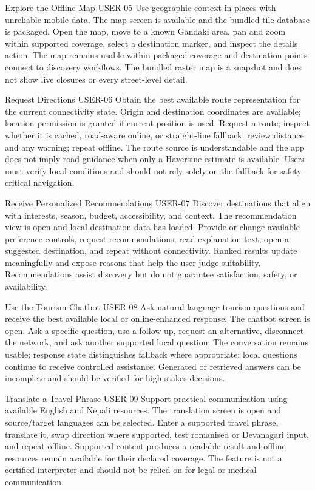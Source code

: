 \EvidenceSheet
{Explore the Offline Map}
{USER-05}
{Use geographic context in places with unreliable mobile data.}
{The map screen is available and the bundled tile database is packaged.}
{Open the map, move to a known Gandaki area, pan and zoom within supported coverage, select a destination marker, and inspect the details action.}
{The map remains usable within packaged coverage and destination points connect to discovery workflows.}
{The bundled raster map is a snapshot and does not show live closures or every street-level detail.}

\EvidenceSheet
{Request Directions}
{USER-06}
{Obtain the best available route representation for the current connectivity state.}
{Origin and destination coordinates are available; location permission is granted if current position is used.}
{Request a route; inspect whether it is cached, road-aware online, or straight-line fallback; review distance and any warning; repeat offline.}
{The route source is understandable and the app does not imply road guidance when only a Haversine estimate is available.}
{Users must verify local conditions and should not rely solely on the fallback for safety-critical navigation.}

\EvidenceSheet
{Receive Personalized Recommendations}
{USER-07}
{Discover destinations that align with interests, season, budget, accessibility, and context.}
{The recommendation view is open and local destination data has loaded.}
{Provide or change available preference controls, request recommendations, read explanation text, open a suggested destination, and repeat without connectivity.}
{Ranked results update meaningfully and expose reasons that help the user judge suitability.}
{Recommendations assist discovery but do not guarantee satisfaction, safety, or availability.}

\EvidenceSheet
{Use the Tourism Chatbot}
{USER-08}
{Ask natural-language tourism questions and receive the best available local or online-enhanced response.}
{The chatbot screen is open.}
{Ask a specific question, use a follow-up, request an alternative, disconnect the network, and ask another supported local question.}
{The conversation remains usable; response state distinguishes fallback where appropriate; local questions continue to receive controlled assistance.}
{Generated or retrieved answers can be incomplete and should be verified for high-stakes decisions.}

\EvidenceSheet
{Translate a Travel Phrase}
{USER-09}
{Support practical communication using available English and Nepali resources.}
{The translation screen is open and source/target languages can be selected.}
{Enter a supported travel phrase, translate it, swap direction where supported, test romanised or Devanagari input, and repeat offline.}
{Supported content produces a readable result and offline resources remain available for their declared coverage.}
{The feature is not a certified interpreter and should not be relied on for legal or medical communication.}

